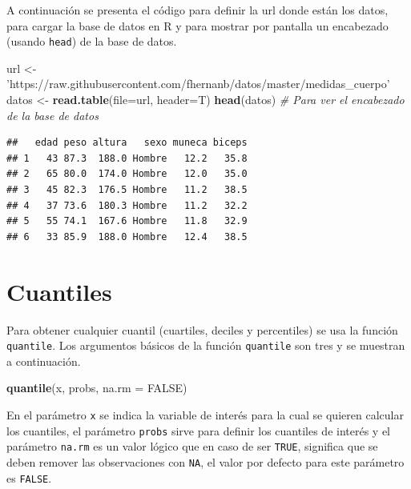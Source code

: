 \documentclass[10pt,]{krantz}
\makeatletter
\newenvironment{Shaded}{\begin{snugshade}}{\end{snugshade}}
\newcommand{\KeywordTok}[1]{\textcolor[rgb]{0.13,0.29,0.53}{\textbf{#1}}}
\newcommand{\DataTypeTok}[1]{\textcolor[rgb]{0.13,0.29,0.53}{#1}}
\newcommand{\StringTok}[1]{\textcolor[rgb]{0.31,0.60,0.02}{#1}}
\newcommand{\CommentTok}[1]{\textcolor[rgb]{0.56,0.35,0.01}{\textit{#1}}}
\newcommand{\OtherTok}[1]{\textcolor[rgb]{0.56,0.35,0.01}{#1}}
\newcommand{\NormalTok}[1]{#1}
\newenvironment{kframe}{%
\medskip{}
\setlength{\fboxsep}{.8em}
 \def\at@end@of@kframe{}%
 \ifinner\ifhmode%
  \def\at@end@of@kframe{\end{minipage}}%
  \begin{minipage}{\columnwidth}%
 \fi\fi%
 \def\FrameCommand##1{\hskip\@totalleftmargin \hskip-\fboxsep
 \colorbox{shadecolor}{##1}\hskip-\fboxsep
     \hskip-\linewidth \hskip-\@totalleftmargin \hskip\columnwidth}%
 \MakeFramed {\advance\hsize-\width
   \@totalleftmargin\z@ \linewidth\hsize
   \@setminipage}}%
 {\par\unskip\endMakeFramed%
 \at@end@of@kframe}
\renewenvironment{Shaded}{\begin{kframe}}{\end{kframe}}
\makeatother
\begin{document}
A continuación se presenta el código para definir la url donde están los
datos, para cargar la base de datos en R y para mostrar por pantalla un
encabezado (usando \texttt{head}) de la base de datos.

\begin{Shaded}
\begin{Highlighting}[]
\NormalTok{url <-}\StringTok{ 'https://raw.githubusercontent.com/fhernanb/datos/master/medidas_cuerpo'}
\NormalTok{datos <-}\StringTok{ }\KeywordTok{read.table}\NormalTok{(}\DataTypeTok{file=}\NormalTok{url, }\DataTypeTok{header=}\NormalTok{T)}
\KeywordTok{head}\NormalTok{(datos)  }\CommentTok{# Para ver el encabezado de la base de datos}
\end{Highlighting}
\end{Shaded}

\begin{verbatim}
##   edad peso altura   sexo muneca biceps
## 1   43 87.3  188.0 Hombre   12.2   35.8
## 2   65 80.0  174.0 Hombre   12.0   35.0
## 3   45 82.3  176.5 Hombre   11.2   38.5
## 4   37 73.6  180.3 Hombre   11.2   32.2
## 5   55 74.1  167.6 Hombre   11.8   32.9
## 6   33 85.9  188.0 Hombre   12.4   38.5
\end{verbatim}

\section{\texorpdfstring{Cuantiles  
 
}{Cuantiles     }}\label{cuantiles}

Para obtener cualquier cuantil (cuartiles, deciles y percentiles) se usa
la función \texttt{quantile}. Los argumentos básicos de la función
\texttt{quantile} son tres y se muestran a continuación.

\begin{Shaded}
\begin{Highlighting}[]
\KeywordTok{quantile}\NormalTok{(x, probs, }\DataTypeTok{na.rm =} \OtherTok{FALSE}\NormalTok{)}
\end{Highlighting}
\end{Shaded}

En el parámetro \texttt{x} se indica la variable de interés para la cual
se quieren calcular los cuantiles, el parámetro \texttt{probs} sirve
para definir los cuantiles de interés y el parámetro \texttt{na.rm} es
un valor lógico que en caso de ser \texttt{TRUE}, significa que se deben
remover las observaciones con \texttt{NA}, el valor por defecto para
este parámetro es \texttt{FALSE}.
\end{document}
